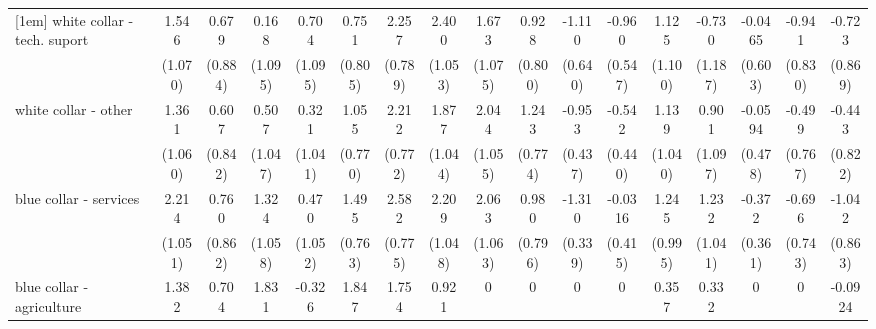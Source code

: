 {\begin{tabular}{l*{16}{c}}
[1em]
white collar - tech. suport&       1.546         &       0.679         &       0.168         &       0.704         &       0.751         &       2.257\sym{**} &       2.400\sym{*}  &       1.673         &       0.928         &      -1.110         &      -0.960         &       1.125         &      -0.730         &     -0.0465         &      -0.941         &      -0.723         \\
                    &     (1.070)         &     (0.884)         &     (1.095)         &     (1.095)         &     (0.805)         &     (0.789)         &     (1.053)         &     (1.075)         &     (0.800)         &     (0.640)         &     (0.547)         &     (1.100)         &     (1.187)         &     (0.603)         &     (0.830)         &     (0.869)         \\
[1em]
white collar - other&       1.361         &       0.607         &       0.507         &       0.321         &       1.055         &       2.212\sym{**} &       1.877         &       2.044         &       1.243         &      -0.953\sym{*}  &      -0.542         &       1.139         &       0.901         &     -0.0594         &      -0.499         &      -0.443         \\
                    &     (1.060)         &     (0.842)         &     (1.047)         &     (1.041)         &     (0.770)         &     (0.772)         &     (1.044)         &     (1.055)         &     (0.774)         &     (0.437)         &     (0.440)         &     (1.040)         &     (1.097)         &     (0.478)         &     (0.767)         &     (0.822)         \\
[1em]
blue collar - services&       2.214\sym{*}  &       0.760         &       1.324         &       0.470         &       1.495         &       2.582\sym{***}&       2.209\sym{*}  &       2.063         &       0.980         &      -1.310\sym{***}&     -0.0316         &       1.245         &       1.232         &      -0.372         &      -0.696         &      -1.042         \\
                    &     (1.051)         &     (0.862)         &     (1.058)         &     (1.052)         &     (0.763)         &     (0.775)         &     (1.048)         &     (1.063)         &     (0.796)         &     (0.339)         &     (0.415)         &     (0.995)         &     (1.041)         &     (0.361)         &     (0.743)         &     (0.863)         \\
[1em]
blue collar - agriculture&       1.382         &       0.704         &       1.831         &      -0.326         &       1.847         &       1.754         &       0.921         &           0         &           0         &           0         &           0         &       0.357         &       0.332         &           0         &           0         &     -0.0924         \\

\end{tabular}}
